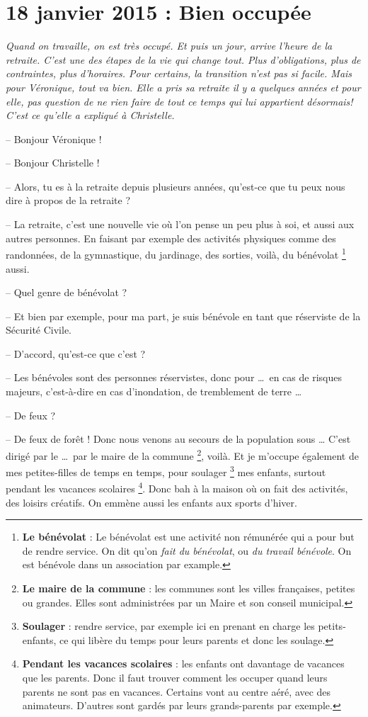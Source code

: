 \documentclass[11pt, french]{report}
\begin{document}
\chapter{18 janvier 2015 : Bien occupée}

\textit{Quand on travaille, on est très occupé. Et puis un jour, arrive
  l’heure de la retraite. C’est une des étapes de la vie qui change tout.
  Plus d’obligations, plus de contraintes, plus d’horaires. Pour certains,
  la transition n’est pas si facile. Mais pour Véronique, tout va bien. Elle
  a pris sa retraite il y a quelques années et pour elle, pas question de
  ne rien faire de tout ce temps qui lui appartient désormais! C’est ce
  qu’elle a expliqué à Christelle.}

\vfill

-- Bonjour Véronique !

-- Bonjour Christelle !

-- Alors, tu es à la retraite depuis plusieurs années, qu'est-ce que tu peux
nous dire à propos de la retraite ?

-- La retraite, c'est une nouvelle vie où l'on pense un peu plus à soi, et
aussi aux autres personnes. En faisant par exemple des activités physiques
comme des randonnées, de la gymnastique, du jardinage, des sorties, voilà,
du bénévolat \footnote{\textbf{Le bénévolat} : Le bénévolat est une activité
  non rémunérée qui a pour but de rendre service. On dit qu'on
  \textit{fait du bénévolat}, ou \textit{du travail bénévole}. On est
  bénévole dans un association par example.} aussi.

-- Quel genre de bénévolat ?

-- Et bien par exemple, pour ma part, je suis bénévole en tant que réserviste
de la Sécurité Civile.

-- D'accord, qu'est-ce que c'est ?

-- Les bénévoles sont des personnes réservistes, donc pour \ldots\ en cas de
risques majeurs, c'est-à-dire en cas d'inondation, de tremblement de
terre \ldots\ 

-- De feux ?

-- De feux de forêt ! Donc nous venons au secours de la population sous \ldots
C'est dirigé par le \ldots\ par le maire de la commune
\footnote{\textbf{Le maire de la commune} : les communes sont les villes
  françaises, petites ou grandes. Elles sont administrées par un Maire et
  son conseil municipal.}, voilà. Et je m'occupe également de mes
petites-filles de temps en temps, pour soulager
\footnote{\textbf{Soulager} : rendre service, par exemple ici en prenant en
  charge les petits-enfants, ce qui libère du temps pour leurs parents et
  donc les soulage.} mes enfants, surtout pendant les vacances scolaires
\footnote{\textbf{Pendant les vacances scolaires} : les enfants ont
  davantage de vacances que les parents. Donc il faut trouver comment les
  occuper quand leurs parents ne sont pas en vacances. Certains vont au
  centre aéré, avec des animateurs. D'autres sont gardés par leurs
  grands-parents par exemple.}. Donc bah à la maison où on fait des
activités, des loisirs créatifs. On emmène aussi les enfants aux sports
d'hiver.
\end{document}
